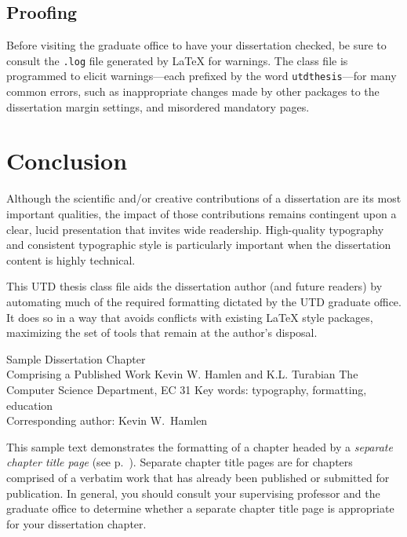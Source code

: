 \documentclass[doublespacing]{utdthesis}
\begin{document}
\section{Proofing}
\label{s:proof}

Before visiting the graduate office to have your dissertation checked, be sure
to consult the \texttt{.log} file generated by \LaTeX{} for warnings.
The class file is programmed to elicit warnings---each prefixed by the word
\texttt{utdthesis}---for many common errors, such as inappropriate changes
made by other packages to the dissertation margin settings, and misordered
mandatory pages.

\chapter{Conclusion}
\label{c:conclude}

Although the scientific and/or creative contributions of a dissertation are
its most important qualities, the impact of those contributions remains
contingent upon a clear, lucid presentation that invites wide readership.
High-quality typography and consistent typographic style is particularly
important when the dissertation content is highly technical.

This UTD thesis class file aids the dissertation author (and future readers)
by automating much of the required formatting dictated by the UTD graduate
office.
It does so in a way that avoids conflicts with existing \LaTeX{} style
packages, maximizing the set of tools that remain at the author's disposal.

\begin{chaptertitlepage}
      {Sample Dissertation Chapter \\ Comprising a Published Work}
      {Kevin W. Hamlen and K.L. Turabian}
      {The Computer Science Department, EC 31}
  \label{c:ctp}
  Key words: typography, formatting, education \\
  Corresponding author: Kevin W.~Hamlen
\end{chaptertitlepage}

This sample text demonstrates the formatting of a chapter headed by a
\emph{separate chapter title page} (see p.~\pageref{c:ctp}).
Separate chapter title pages are for chapters comprised of a verbatim work
that has already been published or submitted for publication.
In general, you should consult your supervising professor and the graduate
office to determine whether a separate chapter title page is appropriate for
your dissertation chapter.
\end{document}
